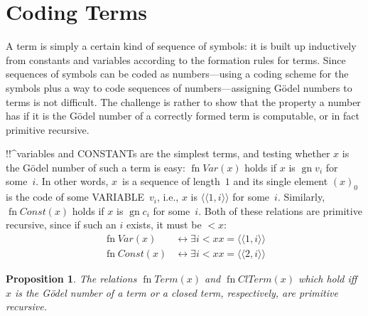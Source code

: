 \documentclass[10pt,a4paper]{article}
\newcommand*{\olup}[1]{\MakeUppercase{#1}}
\theoremstyle{plain}
\newtheorem{prop}[thm]{Proposition}
\theoremstyle{definition}
\theoremstyle{remark}
\newenvironment{explain}{}{}
\newcommand*{\olfileid}[3]{}
\newcommand*{\olsection}[1]{\section*{#1}}
\newcommand*{\ollabel}[1]{\label{#1}}
\providecommand{\Obj}{}
\providecommand{\tuple}[1]{\langle #1 \rangle}
\providecommand{\Gn}{\operatorname{gn}}
\providecommand{\bexists}{\exists}
\providecommand{\defiff}{\mathrel{\leftrightarrow}}
\providecommand{\fn}{\operatorname{fn}}
\begin{document}



\olfileid{inc}{art}{trm}
\olsection{Coding Terms}

\begin{explain}
A term is simply a certain kind of sequence of symbols: it is built up
inductively from constants and variables according to the formation
rules for terms.  Since sequences of symbols can be coded as
numbers---using a coding scheme for the symbols plus a way to code
sequences of numbers---assigning G\"odel numbers to terms is not
difficult.  The challenge is rather to show that the property a number
has if it is the G\"odel number of a correctly formed term is
computable, or in fact primitive recursive.
\end{explain}

!!^{variable}s and \olup{constant}s are the simplest terms, and testing
whether $x$ is the G\"odel number of such a term is easy:
$\fn{Var}(x)$ holds if $x$ is $\Gn{\Obj v_i}$ for some~$i$. In other words,
$x$~is a sequence of length~$1$ and its single element $(x)_0$ is the
code of some \olup{variable}~$\Obj v_i$, i.e., $x$ is $\tuple{\tuple{1, i}}$ for
some~$i$. Similarly, $\fn{Const}(x)$ holds if $x$ is $\Gn{\Obj c_i}$ for
some~$i$. Both of these relations are primitive recursive, since if
such an $i$ exists, it must be $< x$:
\begin{align*}
  \fn{Var}(x) & \defiff \bexists{i<x}{x = \tuple{\tuple{1, i}}}\\
  \fn{Const}(x) & \defiff \bexists{i<x}{x = \tuple{\tuple{2, i}}}
\end{align*}

\begin{prop}
\ollabel{prop:term-primrec}
The relations $\fn{Term}(x)$ and $\fn{ClTerm}(x)$ which hold iff $x$
is the G\"odel number of a term or a closed term, respectively, are
primitive recursive.
\end{prop}
\end{document}
